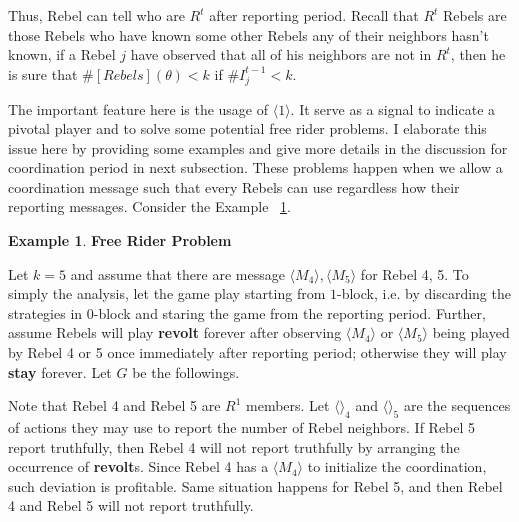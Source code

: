 \documentclass[12pt,letter]{article}
\theoremstyle{definition}
\newtheorem{example}{Example}[section]
\theoremstyle{remark}
\theoremstyle{claim}
\begin{document}
Thus, Rebel can tell who are $R^t$ after reporting period. Recall that $R^t$ Rebels are those Rebels who have known some other Rebels any of their neighbors hasn't known, if a Rebel $j$ have observed that all of his neighbors are not in $R^t$, then he is sure that $\#[Rebels](\theta)< k$ if $\#I^{t-1}_j<k$. 

The important feature here is the usage of $\langle 1 \rangle$. It serve as a signal to indicate a pivotal player and to solve some potential free rider problems. I elaborate this issue here by providing some examples and give more details in the discussion for coordination period in next subsection. These problems happen when we allow a coordination message such that every Rebels can use regardless how their reporting messages. Consider the Example ~\ref{ex_free_rider_tree}.

\begin{example} \label{ex_free_rider_tree}\textbf{Free Rider Problem}

Let $k=5$ and assume that there are message $\langle M_4 \rangle,\langle M_5 \rangle$ for Rebel 4, 5. To simply the analysis, let the game play starting from $1$-block, i.e. by discarding the strategies in $0$-block and staring the game from the reporting period. Further, assume Rebels will play \textbf{revolt} forever after observing $\langle M_4 \rangle$ or $\langle M_5 \rangle$ being played by Rebel 4 or 5 once immediately after reporting period; otherwise they will play \textbf{stay} forever. Let $G$ be the followings.

\begin{center}
\end{center}

Note that Rebel 4 and Rebel 5 are $R^1$ members. Let $\langle \rangle_4$ and $\langle \rangle_5$ are the sequences of actions they may use to report the number of Rebel neighbors. If Rebel 5 report truthfully, then Rebel 4 will not report truthfully by arranging the occurrence of \textbf{revolt}s. Since Rebel 4 has a $\langle M_4 \rangle$ to initialize the coordination, such deviation is profitable. Same situation happens for Rebel 5, and then Rebel 4 and Rebel 5 will not report truthfully.

\end{example}
\end{document}
